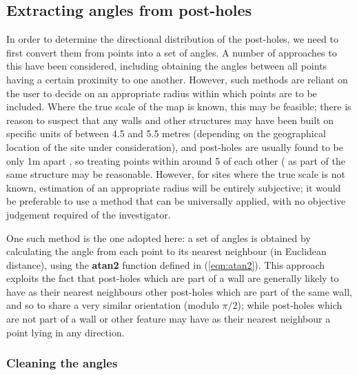 \documentclass[../../ArchStats.tex]{subfiles}
\begin{document}
\subsection{Extracting angles from post-holes}
In order to determine the directional distribution of the post-holes, we need to first convert them from points into a set of angles. A number of approaches to this have been considered, including obtaining the angles between all points having a certain proximity to one another. However, such methods are reliant on the user to decide on an appropriate radius within which points are to be included. Where the true scale of the map is known, this may be feasible; there is reason to suspect that any walls and other structures may have been built on specific units of between 4.5 and 5.5 metres (depending on the geographical location of the site under consideration), and post-holes are usually found to be only 1m apart , so treating points within around 5 of each other ( as part of the same structure may be reasonable. However, for sites where the true scale is not known, estimation of an appropriate radius will be entirely subjective; it would be preferable to use a method that can be universally applied, with no objective judgement required of the investigator.

One such method is the one adopted here: a set of angles is obtained by calculating the angle from each point to its nearest neighbour (in Euclidean distance), using the \textbf{atan2} function defined in (\ref{eqn:atan2}). This approach exploits the fact that post-holes which are part of a wall are generally likely to have as their nearest neighbours other post-holes which are part of the same wall, and so to share a very similar orientation (modulo $\pi/2$); while post-holes which are not part of a wall or other feature may have as their nearest neighbour a point lying in any direction.

\subsubsection{Cleaning the angles}

\end{document}
